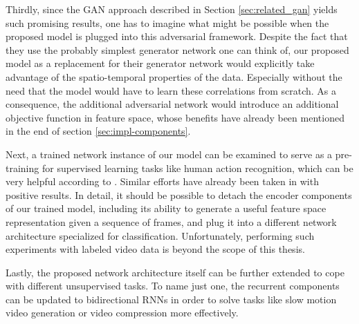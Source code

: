 Thirdly, since the GAN approach described in Section \ref{sec:related_gan} yields such promising results, one has to imagine what might be possible when the proposed model is plugged into this adversarial framework. Despite the fact that they use the probably simplest generator network one can think of, our proposed model as a replacement for their generator network would explicitly take advantage of the spatio-temporal properties of the data. Especially without the need that the model would have to learn these correlations from scratch. As a consequence, the additional adversarial network would introduce an additional objective function in feature space, whose benefits have already been mentioned in the end of section \ref{sec:impl-components}.

Next, a trained network instance of our model can be examined to serve as a pre-training for supervised learning tasks like human action recognition, which can be very helpful according to \parencite[p. 20]{deep_arch_ai}. Similar efforts have already been taken in \parencite{unsup_learn_lstm} with positive results. In detail, it should be possible to detach the encoder components of our trained model, including its ability to generate a useful feature space representation given a sequence of frames, and plug it into a different network architecture specialized for classification. Unfortunately, performing such experiments with labeled video data is beyond the scope of this thesis.

Lastly, the proposed network architecture itself can be further extended to cope with different unsupervised tasks. To name just one, the recurrent components can be updated to bidirectional RNNs in order to solve tasks like slow motion video generation or video compression more effectively.